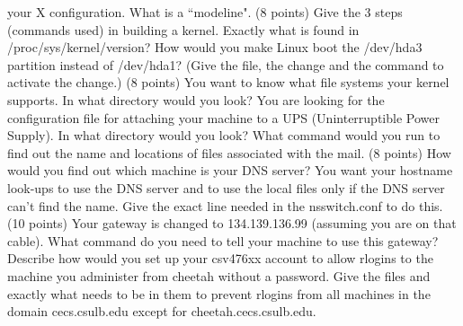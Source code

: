 your X configuration.
\vskip 0.5in
What is a ``modeline".
\vskip 0.5in
\ques
(8 points)
Give the 3 steps (commands used) in building a kernel.
\vskip 0.8in
Exactly what is found in {\ltt{}/proc/sys/kernel/version}?
\vskip 0.8in
How would you make Linux boot the {\ltt{}/dev/hda3} partition
instead of {\ltt{}/dev/hda1}?
(Give the file, the change and the command to activate the change.)
\vfill\eject
\ques
(8 points)
You want to know what file systems your kernel supports.
In what directory would you look?
\vskip 0.5in
You are looking for the configuration file for attaching your machine
to a UPS (Uninterruptible Power Supply).
In what directory would you look?
\vskip 0.5in
What command would you run to find out the name and locations
of files associated with the {\ltt{}mail}.
\vskip 0.5in
\ques
(8 points)
How would you find out which machine is your DNS server?
\vskip 0.5in
You want your hostname look-ups to use the DNS server and
to use the local files only if the DNS server can't find the name.
Give the exact line needed in the {\ltt{}nsswitch.conf} to do this.
\vskip 0.5in
\ques
(10 points)
Your gateway is changed to {\ltt{}134.139.136.99} (assuming you are
on that cable).
What command do you need to tell your machine to use this gateway?
\vskip 0.5in
Describe how would you set up your {\ltt{}csv476xx} account to allow rlogins
to the machine you administer from {\ltt{}cheetah} without a password.
\vskip 1.5in
Give the files and exactly what needs to be in them to prevent rlogins
from all machines in the domain {\ltt{}cecs.csulb.edu} except for
{\ltt{}cheetah.cecs.csulb.edu}.
\bye
